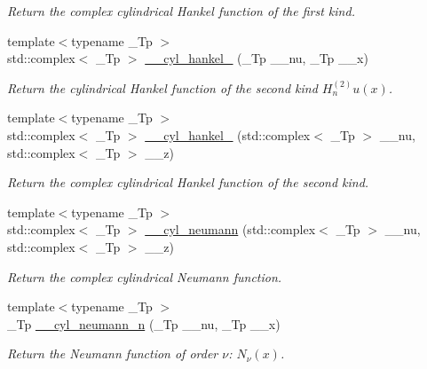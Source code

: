 \begin{DoxyCompactItemize}
\begin{DoxyCompactList}\small\item\em Return the complex cylindrical Hankel function of the first kind. \end{DoxyCompactList}\item 
{\footnotesize template$<$typename \+\_\+\+Tp $>$ }\\std\+::complex$<$ \+\_\+\+Tp $>$ \hyperlink{namespacestd_1_1____detail_a98615677d4042ef02fe2faf326f1a614}{\+\_\+\+\_\+cyl\+\_\+hankel\+\_} (\+\_\+\+Tp \+\_\+\+\_\+nu, \+\_\+\+Tp \+\_\+\+\_\+x)
\begin{DoxyCompactList}\small\item\em Return the cylindrical Hankel function of the second kind $ H^{(2)}_nu(x) $. \end{DoxyCompactList}\item 
{\footnotesize template$<$typename \+\_\+\+Tp $>$ }\\std\+::complex$<$ \+\_\+\+Tp $>$ \hyperlink{namespacestd_1_1____detail_a3a8bdfd85729c705dec2586dfa5b275b}{\+\_\+\+\_\+cyl\+\_\+hankel\+\_} (std\+::complex$<$ \+\_\+\+Tp $>$ \+\_\+\+\_\+nu, std\+::complex$<$ \+\_\+\+Tp $>$ \+\_\+\+\_\+z)
\begin{DoxyCompactList}\small\item\em Return the complex cylindrical Hankel function of the second kind. \end{DoxyCompactList}\item 
{\footnotesize template$<$typename \+\_\+\+Tp $>$ }\\std\+::complex$<$ \+\_\+\+Tp $>$ \hyperlink{namespacestd_1_1____detail_ac73a4e3b8ac311760c998277aadb0fcb}{\+\_\+\+\_\+cyl\+\_\+neumann} (std\+::complex$<$ \+\_\+\+Tp $>$ \+\_\+\+\_\+nu, std\+::complex$<$ \+\_\+\+Tp $>$ \+\_\+\+\_\+z)
\begin{DoxyCompactList}\small\item\em Return the complex cylindrical Neumann function. \end{DoxyCompactList}\item 
{\footnotesize template$<$typename \+\_\+\+Tp $>$ }\\\+\_\+\+Tp \hyperlink{namespacestd_1_1____detail_ae414a6b5c064dc2b9b9a3b28e6cec813}{\+\_\+\+\_\+cyl\+\_\+neumann\+\_\+n} (\+\_\+\+Tp \+\_\+\+\_\+nu, \+\_\+\+Tp \+\_\+\+\_\+x)
\begin{DoxyCompactList}\small\item\em Return the Neumann function of order $ \nu $\+: $ N_{\nu}(x) $. \end{DoxyCompactList}\item 

\end{DoxyCompactItemize}
